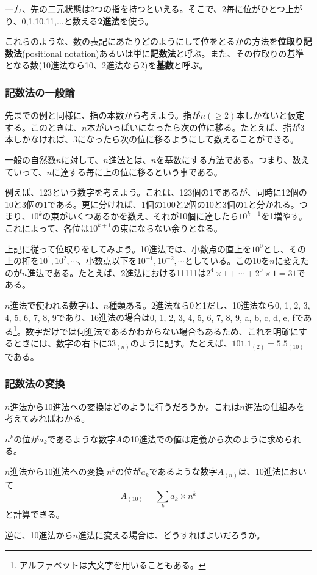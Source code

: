 一方、先の二元状態は2つの指を持つといえる。そこで、2毎に位がひとつ上がり、0,1,10,11,...と数える\textbf{2進法}を使う。

これらのような、数の表記にあたりどのようにして位をとるかの方法を\textbf{位取り記数法}(positional notation)あるいは単に\textbf{記数法}と呼ぶ。また、その位取りの基準となる数(10進法なら10、2進法なら2)を\textbf{基数}と呼ぶ。

\subsubsection{記数法の一般論}
先までの例と同様に、指の本数から考えよう。指が$n(\ge2)$本しかないと仮定する。このときは、$n$本がいっぱいになったら次の位に移る。たとえば、指が3本しかなければ、3になったら次の位に移るようにして数えることができる。

一般の自然数$n$に対して、$n$進法とは、$n$を基数にする方法である。つまり、数えていって、$n$に達する毎に上の位に移るという事である。

例えば、123という数字を考えよう。これは、123個の1であるが、同時に12個の10と3個の1である。更に分ければ、1個の100と2個の10と3個の1と分かれる。つまり、$10^k$の束がいくつあるかを数え、それが10個に達したら$10^{k+1}$を1増やす。これによって、各位は$10^{k+1}$の束にならない余りとなる。

上記に従って位取りをしてみよう。10進法では、小数点の直上を$10^0$とし、その上の桁を$10^1,10^2,\cdots$、小数点以下を$10^{-1},10^{-2},\cdots$としている。この10を$n$に変えたのが$n$進法である。たとえば、2進法における11111は$2^4\times1+\cdots+2^0\times1=31$である。

$n$進法で使われる数字は、$n$種類ある。2進法なら0と1だし、10進法なら0, 1, 2, 3, 4, 5, 6, 7, 8, 9であり、16進法の場合は0, 1, 2, 3, 4, 5, 6, 7, 8, 9, a, b, c, d, e, fである\footnote{アルファベットは大文字を用いることもある。}。数字だけでは何進法であるかわからない場合もあるため、これを明確にするときには、数字の右下に$33_{(n)}$のように記す。たとえば、$101.1_{(2)}=5.5_{(10)}$である。

\subsubsection{記数法の変換}
$n$進法から10進法への変換はどのように行うだろうか。これは$n$進法の仕組みを考えてみればわかる。

$n^k$の位が$a_k$であるような数字$A$の10進法での値は定義から次のように求められる。
\begin{itembox}[l]{$n$進法から10進法への変換}
$n^k$の位が$a_k$であるような数字$A_{(n)}$は、10進法において
\begin{equation*}
A_{(10)}=\sum_{k}a_k\times n^k
\end{equation*}
と計算できる。
\end{itembox}
逆に、10進法から$n$進法に変える場合は、どうすればよいだろうか。

